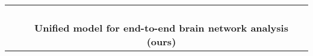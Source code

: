 \begin{table}[ht]
{\begin{tabular}{|c|c|c|cccc|}
\hhline{|~--~~~-|}
                          & \multicolumn{2}{c|}{{\cellcolor[rgb]{0.753,0.753,0.753}}\cite{su2022ernet}}                    &                                                            &                                                           &                                                           &                                       \\ 
\hhline{|~---~~~|}
                          &                                       & \multicolumn{2}{c|}{{\cellcolor[rgb]{0.753,0.753,0.753}}\cite{qiu2021u, xu2019deepatlas,he2020deep}}                                         &                                                           &                                                           &                                       \\ 
\hhline{|~---~~~|}
                          & \multicolumn{3}{c|}{{\cellcolor[rgb]{0.753,0.753,0.753}}\cite{su2023one}}                                                                                 & \multicolumn{1}{l}{}                                      & \multicolumn{1}{l}{}                                      & \multicolumn{1}{l|}{}                 \\ 
\hhline{|~---~--|}
                          & \multicolumn{1}{l}{}                  & \multicolumn{1}{l}{}                  & \multicolumn{1}{l}{}                                       & \multicolumn{1}{l|}{}                                     & \multicolumn{2}{c|}{{\cellcolor[rgb]{0.753,0.753,0.753}}\cite{kan2022fbnetgen,mahmood2021deep,yu2023deep}}                                       \\ 
\hhline{|~------|}
                          & \multicolumn{6}{c|}{{\cellcolor[rgb]{0.753,0.753,0.753}}\textbf{Unified model for end-to-end brain network analysis (ours)}}                                                                                                                                                                                                                                                \\
\hline
\end{tabular}
}
\label{tab: family}
\vspace{-0pt}
\end{table}

